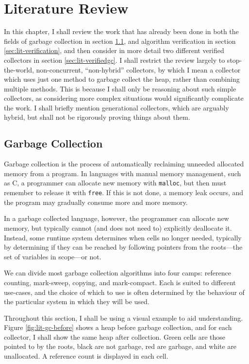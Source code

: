 \chapter{Literature Review}
\label{sec:lit}

In this chapter, I shall review the work that has already been done in
both the fields of \gls{garbage collection} in section
\ref{sec:lit-gc}, and \gls{algorithm verification} in section
\ref{sec:lit-verification}, and then consider in more detail two
different verified \glspl{collector} in section
\ref{sec:lit-verifiedgc}. I shall restrict the review largely to
stop-the-world, non-concurrent, ``non-hybrid'' \glspl{collector}, by
which I mean a \gls{collector} which uses just one method to garbage
collect the \gls{heap}, rather than combining multiple methods. This
is because I shall only be reasoning about such simple
\glspl{collector}, as considering more complex situations would
significantly complicate the work. I shall briefly mention
generational \glspl{collector}, which are arguably hybrid, but shall
not be rigorously proving things about them.

\section{Garbage Collection}
\label{sec:lit-gc}

Garbage collection is the process of automatically reclaiming unneeded
allocated memory from a program. In languages with manual memory
management, such as C, a programmer can allocate new memory with
\texttt{malloc}, but then must remember to release it with
\texttt{free}. If this is not done, a memory leak occurs, and the
program may gradually consume more and more memory\cite{KandR}.

In a garbage collected language, however, the programmer can allocate
new memory, but typically cannot (and does not need to) explicitly
deallocate it. Instead, some runtime system determines when
\glspl{cell} no longer needed, typically by determining if they can be
reached by following pointers from the \glspl{root}---the set of
variables in scope---or not.

We can divide most garbage collection algorithms into four camps:
\gls{reference counting}, \gls{mark-sweep}, \gls{copying}, and
\gls{mark-compact}. Each is suited to different use-cases, and the
choice of which to use is often determined by the behaviour of the
particular system in which they will be used.

Throughout this section, I shall be using a visual example to aid
understanding. Figure \ref{fig:lit-gc-before} shows a \gls{heap}
before \gls{garbage collection}, and for each \gls{collector}, I shall
show the same \gls{heap} after collection. Green \glspl{cell} are
those pointed to by the \glspl{root}, black are not garbage, red are
garbage, and white are unallocated. A reference count is displayed in
each \gls{cell}.

